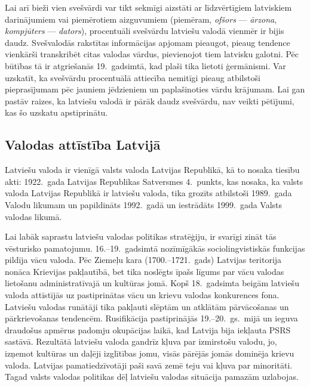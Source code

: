 \begin{multicols}{2}
Lai arī bieži vien svešvārdi var tikt sekmīgi aizstāti ar līdzvērtīgiem latviskiem darinājumiem vai piemērotiem aizguvumiem (piemēram, \textit{ofšors} --- \textit{ārzona}, \textit{kompjūters} --- \textit{dators}), procentuāli svešvārdu latviešu valodā vienmēr ir bijis daudz.  Svešvalodās rakstītas informācijas apjomam pieaugot, pieaug tendence vienkārši transkribēt citas valodas vārdus, pievienojot tiem latvisku galotni.  Pēc būtības tā ir atgriešanās 19.~gadsimtā, kad plaši tika lietoti ģermānismi.  Var uzskatīt, ka svešvārdu procentuālā attiecība nemitīgi pieaug atbilstoši pieprasījumam pēc jauniem jēdzieniem un paplašinoties vārdu \mbox{krājumam}.  Lai gan pastāv raizes, ka latviešu valodā ir pārāk daudz svešvārdu, nav veikti pētījumi, kas šo uzskatu apstiprinātu.

\subsection{Valodas attīstība Latvijā}

Latviešu valoda ir vienīgā valsts valoda Latvijas Republikā, kā to nosaka tiesību akti: 1922.~gada Latvijas Republikas Satversmes 4.~punkts, kas nosaka, ka valsts valoda Latvijas Republikā ir latviešu valoda, tika grozīts atbilstoši 1989.~gada Valodu likumam un papildināts 1992.~gadā un iestrādāts 1999.~gada Valsts valodas likumā.


Lai labāk saprastu latviešu valodas politikas stratēģiju, ir svarīgi zināt tās vēsturisko pamatojumu.
16.–19.~gadsimtā nozīmīgākās sociolingvistiskās funkcijas pildīja vācu valoda. 
Pēc Ziemeļu kara (1700.–1721.~gads) Latvijas teritorija nonāca Krievijas pakļautībā, bet tika noslēgts īpašs līgums par vācu valodas lietošanu administratīvajā un kultūras jomā. 
Kopš 18.~gadsimta beigām latviešu valoda attīstījās uz pastiprinātas vācu un krievu valodas konkurences fona. 
Latviešu valodas runātāji tika pakļauti slēptām un atklātām pārvācošanas un pārkrievošanas tendencēm. 
Rusifikācija pastiprinājās 19.–20.~gs.~mijā un ieguva draudošus apmērus padomju okupācijas laikā, kad Latvija bija iekļauta PSRS sastāvā. 
Rezultātā latviešu valoda gandrīz kļuva par izmirstošu valodu, jo, izņemot kultūras un daļēji izglītības jomu, visās pārējās jomās dominēja krievu valoda. 
Latvijas pamatiedzīvotāji paši savā zemē teju vai kļuva par minoritāti. 
Tagad valsts valodas politikas dēļ latviešu valodas situācija pamazām uzlabojas.


\end{multicols}
